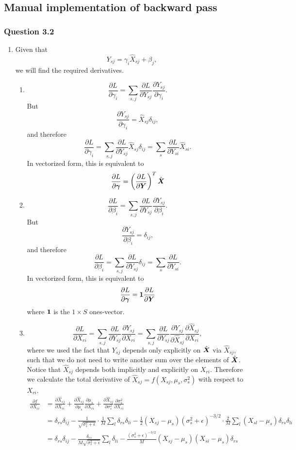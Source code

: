 \documentclass{article}
\newcommand{\pfrac}[2]{\frac{\partial #1}{\partial #2}}
\begin{document}
\subsection{Manual implementation of backward pass}
\subsubsection*{Question 3.2}
\begin{enumerate}[label=(\alph*)]
	\item 
	Given that
	$$
	Y_{sj} = \gamma_i\hat{X}_{sj} + \beta_j,
	$$ we will find the required derivatives. 
	\begin{enumerate}[label=(\roman*)]
		\item 
		$$
		\pfrac{L}{\gamma_i} = \sum_{s,j}\pfrac{L}{Y_{sj}}\pfrac{Y_{sj}}{\gamma_i}.
		$$
		But
		$$
		\pfrac{Y_{sj}}{\gamma_i} = \hat{X}_{sj}\delta_{ij},
		$$
		and therefore
		$$
		\pfrac{L}{\gamma_i} = \sum_{s,j}\pfrac{L}{Y_{sj}}\hat{X}_{sj}\delta_{ij} = \sum_s\pfrac{L}{Y_{si}}\hat{X}_{si}.
		$$ In vectorized form, this is equivalent to
		$$
		\pfrac{L}{\b \gamma} = \left(\pfrac{L}{\b Y}\right)^T\hat{\b X}
		$$
		\item
		$$
		\pfrac{L}{\beta_i} = \sum_{s,j}\pfrac{L}{Y_{sj}}\pfrac{Y_{sj}}{\beta_i}.
		$$
		But
		$$
		\pfrac{Y_{sj}}{\beta_i} = \delta_{ij},
		$$
		and therefore
		$$
		\pfrac{L}{\beta_i} = \sum_{s,j}\pfrac{L}{Y_{sj}}\delta_{ij} = \sum_s\pfrac{L}{Y_{si}}.
		$$ In vectorized form, this is equivalent to
		$$
		\pfrac{L}{\b \gamma} = \b 1\pfrac{L}{\b Y}
		$$ where $\b 1$ is the $1 \times S$ ones-vector.
		\item 
		$$
		\pfrac{L}{X_{ri}} = \sum_{s,j}\pfrac{L}{Y_{sj}}\pfrac{Y_{sj}}{X_{ri}} = \sum_{s,j}\pfrac{L}{Y_{sj}}\pfrac{Y_{sj}}{\hat{X}_{sj}}\pfrac{\hat{X}_{sj}}{X_{ri}},
		$$ where we used the fact that $Y_{sj}$ depends only explicitly on $\hat{\b X}$ via $\hat{X}_{sj}$, such that we do not need to write another sum over the elements of $\hat{\b X}$. Notice that $\hat{X}_{sj}$ depends both implicitly and explicitly on $X_{ri}$. Therefore we calculate the total derivative of $\hat{X}_{sj} = f(X_{sj}, \mu_s, \sigma^2_s)$ with respect to $X_{ri}$.
		$$
		\begin{aligned}
		\pfrac{f}{X_{ri}} &= \pfrac{\hat{X}_{sj}}{X_{ri}} + \pfrac{\hat{X}_{sj}}{\mu_s}\pfrac{\mu_s}{X_{ri}} + \pfrac{\hat{X}_{sj}}{\sigma_s^2}\pfrac{\sigma_s^2}{X_{ri}} \\ &= \delta_{rs}\delta_{ij} -\frac{1}{\sqrt{\sigma_s^2 + \epsilon}}\cdot\frac{1}{M}\sum_l\delta_{rs}\delta_{li} - \frac{1}{2}\left(X_{sj} - \mu_s\right)\left(\sigma_s^2 + \epsilon\right)^{-3 / 2}\cdot\frac{2}{M}\sum_l\left(X_{sl} - \mu_s\right)\delta_{rs}\delta_{li} \\ &= \delta_{rs}\delta_{ij} -\frac{\delta_{rs}}{M\sqrt{\sigma_s^2 + \epsilon}}\sum_l\delta_{li} - \frac{\left(\sigma_s^2 + \epsilon\right)^{-3 / 2}}{M}\left(X_{sj} - \mu_s\right)\left(X_{si} - \mu_s\right)\delta_{rs} 

\end{aligned}$$
\end{enumerate}
\end{enumerate}
\end{document}
